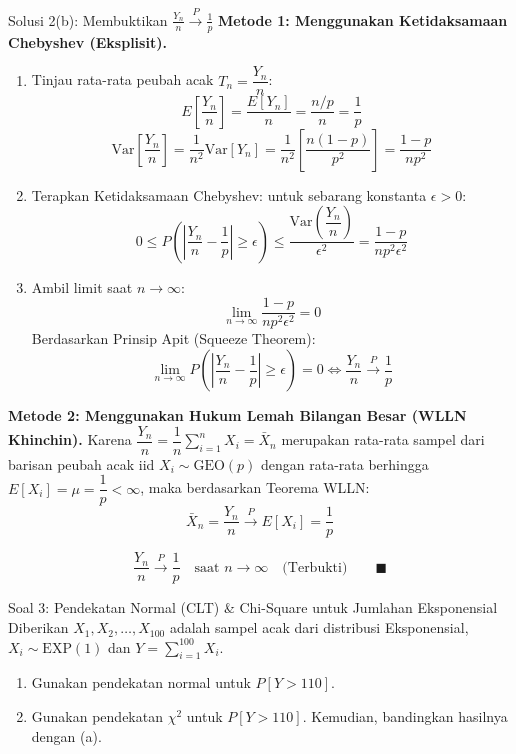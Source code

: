 \documentclass[10pt,twoside]{article}
\begin{document}
\begin{solbox}{Solusi 2(b): Membuktikan $\frac{Y_n}{n} \xrightarrow{P} \frac{1}{p}$}
\textbf{Metode 1: Menggunakan Ketidaksamaan Chebyshev (Eksplisit).}
\begin{enumerate}[label=\arabic*.]
  \item Tinjau rata-rata peubah acak $T_n = \dfrac{Y_n}{n}$:
  \[
  E\left[\frac{Y_n}{n}\right] = \frac{E[Y_n]}{n} = \frac{n/p}{n} = \frac{1}{p}
  \]
  \[
  \mathrm{Var}\left[\frac{Y_n}{n}\right] = \frac{1}{n^2} \mathrm{Var}[Y_n] = \frac{1}{n^2} \left[\frac{n(1-p)}{p^2}\right] = \frac{1-p}{n p^2}
  \]
  \item Terapkan Ketidaksamaan Chebyshev: untuk sebarang konstanta $\epsilon > 0$:
  \[
  0 \le P\left(\left|\frac{Y_n}{n} - \frac{1}{p}\right| \ge \epsilon\right) \le \frac{\mathrm{Var}\left(\dfrac{Y_n}{n}\right)}{\epsilon^2} = \frac{1-p}{n p^2 \epsilon^2}
  \]
  \item Ambil limit saat $n \to \infty$:
  \[
  \lim_{n \to \infty} \frac{1-p}{n p^2 \epsilon^2} = 0
  \]
  Berdasarkan Prinsip Apit (Squeeze Theorem):
  \[
  \lim_{n \to \infty} P\left(\left|\frac{Y_n}{n} - \frac{1}{p}\right| \ge \epsilon\right) = 0 \iff \frac{Y_n}{n} \xrightarrow{P} \frac{1}{p}
  \]
\end{enumerate}

\textbf{Metode 2: Menggunakan Hukum Lemah Bilangan Besar (WLLN Khinchin).}
Karena $\dfrac{Y_n}{n} = \dfrac{1}{n}\sum_{i=1}^n X_i = \bar{X}_n$ merupakan rata-rata sampel dari barisan peubah acak iid $X_i \sim \text{GEO}(p)$ dengan rata-rata berhingga $E[X_i] = \mu = \dfrac{1}{p} < \infty$, maka berdasarkan Teorema WLLN:
\[
\bar{X}_n = \frac{Y_n}{n} \xrightarrow{P} E[X_i] = \frac{1}{p}
\]

\[
\boxed{\frac{Y_n}{n} \xrightarrow{P} \frac{1}{p} \quad \text{saat } n \to \infty \quad \text{(Terbukti)}} \qquad \blacksquare
\]
\end{solbox}

\begin{soalbox}{Soal 3: Pendekatan Normal (CLT) \& Chi-Square untuk Jumlahan Eksponensial}
Diberikan $X_1, X_2, \dots, X_{100}$ adalah sampel acak dari distribusi Eksponensial, $X_i \sim \text{EXP}(1)$ dan $Y = \sum_{i=1}^{100} X_i$.
\begin{enumerate}[label=(\alph*)]
  \item Gunakan pendekatan normal untuk $P[Y > 110]$.
  \item Gunakan pendekatan $\chi^2$ untuk $P[Y > 110]$. Kemudian, bandingkan hasilnya dengan (a).
\end{enumerate}
\end{soalbox}
\end{document}
